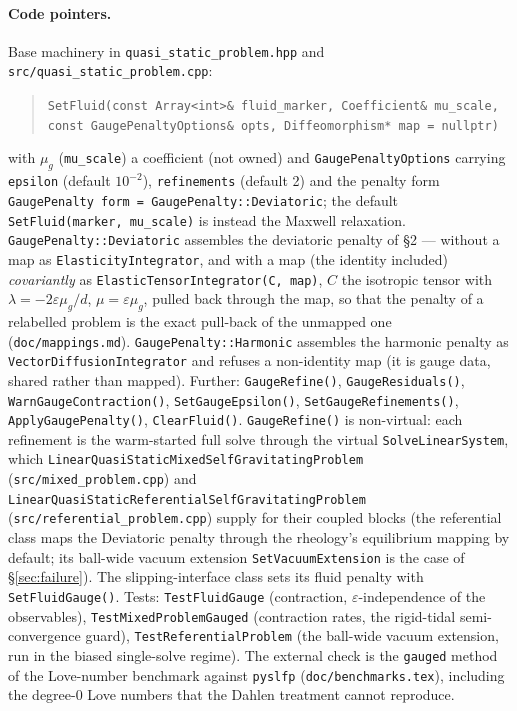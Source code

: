 \documentclass[11pt]{article}
\newcommand{\eps}{\varepsilon}
\begin{document}
\paragraph{Code pointers.}
Base machinery in \texttt{quasi\_static\_problem.hpp} and
\texttt{src/quasi\_static\_problem.cpp}:
\begin{quote}\small\raggedright
\texttt{SetFluid(const Array<int>\& fluid\_marker,
Coefficient\& mu\_scale, const GaugePenaltyOptions\& opts,
Diffeomorphism* map = nullptr)}
\end{quote}
with $\mu_g$ (\texttt{mu\_scale}) a coefficient (not owned) and
\texttt{GaugePenaltyOptions} carrying \texttt{epsilon} (default
$10^{-2}$), \texttt{refinements} (default 2) and the penalty form
\texttt{GaugePenalty form = GaugePenalty::Deviatoric}; the default
\texttt{SetFluid(marker, mu\_scale)} is instead the Maxwell relaxation. \texttt{GaugePenalty::Deviatoric}
assembles the deviatoric penalty of \S2 --- without a map as
\texttt{ElasticityIntegrator}, and with a map (the identity included)
\emph{covariantly} as \texttt{ElasticTensorIntegrator(C, map)}, $C$ the
isotropic tensor with $\lambda = -2\eps\mu_g/d$, $\mu = \eps\mu_g$, pulled
back through the map, so that the penalty of a relabelled problem is the
exact pull-back of the unmapped one (\texttt{doc/mappings.md}).
\texttt{GaugePenalty::Harmonic} assembles the harmonic penalty as
\texttt{VectorDiffusionIntegrator} and refuses a non-identity map (it is
gauge data, shared rather than mapped). Further:
\texttt{GaugeRefine()}, \texttt{GaugeResiduals()},
\texttt{WarnGaugeContraction()}, \texttt{SetGaugeEpsilon()},
\texttt{SetGaugeRefinements()}, \texttt{ApplyGaugePenalty()},
\texttt{ClearFluid()}. \texttt{GaugeRefine()} is non-virtual: each
refinement is the warm-started full solve through the virtual
\texttt{SolveLinearSystem}, which
\texttt{LinearQuasiStaticMixedSelfGravitatingProblem}
(\texttt{src/mixed\_problem.cpp}) and
\texttt{LinearQuasiStaticReferentialSelfGravitatingProblem}
(\texttt{src/referential\_problem.cpp}) supply for their coupled blocks
(the referential class maps the Deviatoric penalty through the
rheology's equilibrium mapping by default; its ball-wide vacuum
extension \texttt{SetVacuumExtension} is the case of
\S\ref{sec:failure}). The slipping-interface class sets its
fluid penalty with \texttt{SetFluidGauge()}.
Tests: \texttt{TestFluidGauge} (contraction, $\eps$-independence of the
observables), \texttt{TestMixedProblemGauged} (contraction rates, the
rigid-tidal semi-convergence guard), \texttt{TestReferentialProblem}
(the ball-wide vacuum extension, run in the biased single-solve regime).
The external check is the \texttt{gauged} method of the Love-number
benchmark against \texttt{pyslfp} (\texttt{doc/benchmarks.tex}),
including the degree-0 Love numbers that the Dahlen treatment cannot
reproduce.
\end{document}
